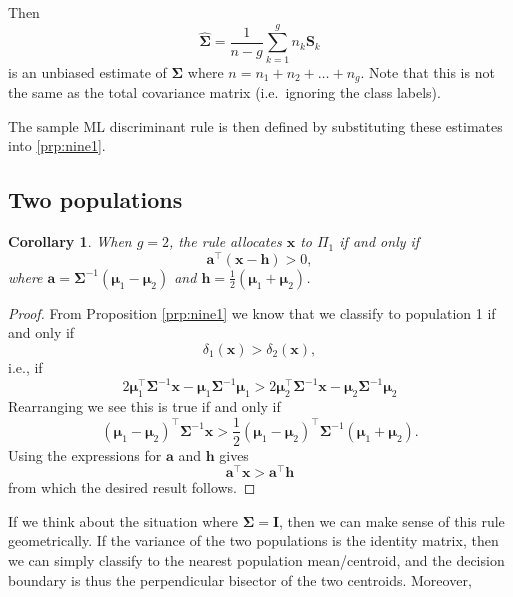 \documentclass[
]{book}
\newtheorem{corollary}{Corollary}[chapter]
\theoremstyle{definition}
\theoremstyle{definition}
\theoremstyle{definition}
\theoremstyle{definition}
\theoremstyle{remark}
\begin{document}
Then
\begin{equation}
\widehat{\boldsymbol{\Sigma}} = \frac{1}{n-g} \sum_{k=1}^g n_k \mathbf S_k \label{eq:ldawithin}
 \end{equation}
is an unbiased estimate of \(\boldsymbol{\Sigma}\) where \(n = n_1 + n_2 + \ldots + n_g\). Note that this is not the same as the total covariance matrix (i.e.~ignoring the class labels).

The sample ML discriminant rule is then defined by substituting these estimates into \ref{prp:nine1}.

\hypertarget{two-populations}{%
\subsection{Two populations}\label{two-populations}}

\begin{corollary}
\protect\hypertarget{cor:nine2c}{}{\label{cor:nine2c} }When \(g=2\), the rule allocates \(\mathbf x\) to \(\Pi_1\) if and only if
\[\mathbf a^\top (\mathbf x- \mathbf h) > 0, \]
where \(\mathbf a= \boldsymbol{\Sigma}^{-1} ({\boldsymbol{\mu}}_1 - {\boldsymbol{\mu}}_2)\) and \(\mathbf h= \frac{1}{2} ({\boldsymbol{\mu}}_1 + {\boldsymbol{\mu}}_2)\).
\end{corollary}

\begin{proof}
From Proposition \ref{prp:nine1} we know that we classify to population 1 if and only if
\[\delta_1(\mathbf x)>\delta_2(\mathbf x),\]
i.e., if
\[2{\boldsymbol{\mu}}_1^\top \boldsymbol{\Sigma}^{-1} \mathbf x-{\boldsymbol{\mu}}_1\boldsymbol{\Sigma}^{-1}{\boldsymbol{\mu}}_1> 2{\boldsymbol{\mu}}_2^\top \boldsymbol{\Sigma}^{-1} \mathbf x-{\boldsymbol{\mu}}_2 \boldsymbol{\Sigma}^{-1}{\boldsymbol{\mu}}_2\]
Rearranging we see this is true if and only if
\[({\boldsymbol{\mu}}_1-{\boldsymbol{\mu}}_2)^\top \boldsymbol{\Sigma}^{-1} \mathbf x> \frac{1}{2}({\boldsymbol{\mu}}_1-{\boldsymbol{\mu}}_2)^\top\boldsymbol{\Sigma}^{-1}({\boldsymbol{\mu}}_1+{\boldsymbol{\mu}}_2).\]
Using the expressions for \(\mathbf a\) and \(\mathbf h\) gives
\[\mathbf a^\top \mathbf x> \mathbf a^\top \mathbf h\]
from which the desired result follows.
\end{proof}

If we think about the situation where \(\boldsymbol{\Sigma}= \mathbf I\), then we can make sense of this rule geometrically. If the variance of the two populations is the identity matrix, then we can simply classify to the nearest population mean/centroid, and the decision boundary is thus the perpendicular bisector of the two centroids. Moreover,
\end{document}
